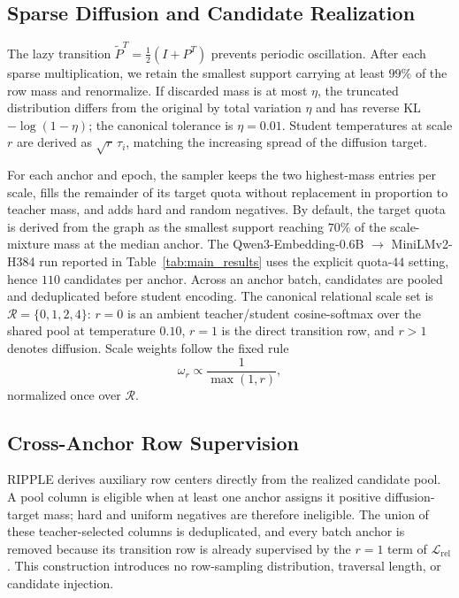 \subsection{Sparse Diffusion and Candidate Realization}
\label{app:candidates}

The lazy transition $\widetilde P^T=\tfrac12(I+P^T)$ prevents periodic oscillation. After each sparse multiplication, we retain the smallest support carrying at least $99\%$ of the row mass and renormalize. If discarded mass is at most $\eta$, the truncated distribution differs from the original by total variation $\eta$ and has reverse KL $-\log(1-\eta)$; the canonical tolerance is $\eta=0.01$. Student temperatures at scale $r$ are derived as $\sqrt r\,\tau_i$, matching the increasing spread of the diffusion target.

For each anchor and epoch, the sampler keeps the two highest-mass entries per scale, fills the remainder of its target quota without replacement in proportion to teacher mass, and adds hard and random negatives. By default, the target quota is derived from the graph as the smallest support reaching $70\%$ of the scale-mixture mass at the median anchor. The Qwen3-Embedding-0.6B $\rightarrow$ MiniLMv2-H384 run reported in Table~\ref{tab:main_results} uses the explicit quota-$44$ setting, hence $110$ candidates per anchor. Across an anchor batch, candidates are pooled and deduplicated before student encoding. The canonical relational scale set is $\mathcal R=\{0,1,2,4\}$: $r=0$ is an ambient teacher/student cosine-softmax over the shared pool at temperature $0.10$, $r=1$ is the direct transition row, and $r>1$ denotes diffusion. Scale weights follow the fixed rule
\begin{equation}
\omega_r\propto\frac{1}{\max(1,r)},
\end{equation}
normalized once over $\mathcal R$.

\subsection{Cross-Anchor Row Supervision}

RIPPLE derives auxiliary row centers directly from the realized candidate pool. A pool column is eligible when at least one anchor assigns it positive diffusion-target mass; hard and uniform negatives are therefore ineligible. The union of these teacher-selected columns is deduplicated, and every batch anchor is removed because its transition row is already supervised by the $r=1$ term of $\mathcal L_{\mathrm{rel}}$. This construction introduces no row-sampling distribution, traversal length, or candidate injection.

